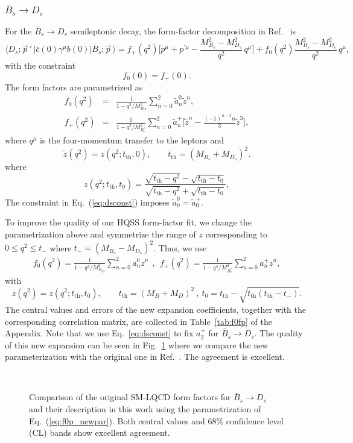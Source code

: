 \documentclass[aps,superscriptaddress,showpacs,nofootinbib,11pt]{revtex4-1}
\newcommand{\be}{\begin{equation}} \newcommand{\ee}{\end{equation}}
\newcommand{\bea}{\begin{eqnarray}} \newcommand{\eea}{\end{eqnarray}}
\newcommand{\mbs}{M_{B_s}}
\newcommand{\mds}{M_{D_s}}
\newcommand\tth{t_\text{th}}
\newcommand\zhpqcd{\tilde z}
\begin{document}
\subsubsection{$\bar B_s\to
D_s$}
For the $\bar B_s\to D_s$ semileptonic decay, the form-factor
decomposition in Ref.~\cite{McLean:2019qcx} is
\be
\langle D_s;\vec p\,'\,|\bar c(0)\gamma^\mu b(0)|\bar B_s;\vec p\,\rangle=
f_+(q^2)\Big[p^\mu+p^{\prime\mu}-\frac{\mbs^2-\mds^2}{q^2}\,q^\mu\Big]
+f_0(q^2)\frac{\mbs^2-\mds^2}{q^2}\,q^\mu,
\ee
with the constraint
\be
f_0(0)=f_+(0).
\label{eq:dsconst}
\ee
The form factors are parametrized  as~\cite{McLean:2019qcx}
\bea
f_0(q^2)&=&\frac1{1-q^2/M^2_{B_{c0}}}\sum_{n=0}^2
 \tilde a^0_n \zhpqcd^n,\nonumber\\
f_+(q^2)&=&\frac1{1-q^2/M^2_{B^*_{c}}}\sum_{n=0}^2
 \tilde a^+_n \Big[\zhpqcd^n
-\frac{(-1)^{n-3}n}{3}\zhpqcd^3\Big],
\eea
where $q^\mu$ is the four-momentum transfer to the leptons and 
\be
\zhpqcd(q^2)= z(q^2;\tth,0), \qquad \tth=(\mbs+\mds)^2.
\ee
where
\be
z(q^2;\tth,t_0)=\frac{\sqrt{\tth-q^2}-\sqrt{\tth-t_0}}{\sqrt{\tth-q^2}+\sqrt{\tth-t_0}}, \label{eq:defz}
\ee
%
The constraint in Eq.~(\ref{eq:dsconst}) imposes $\tilde a_0^0=\tilde
a_0^+$.




To improve the quality of our  HQSS  form-factor fit,  we change the parametrization
above and  symmetrize the range of $z$ corresponding to $0 \leq q^2 \leq
t_-$ where $t_-=(\mbs-\mds)^2$. Thus, we use
%
\bea
f_0(q^2)=\frac1{1-q^2/M^2_{B_{c0}}}\sum_{n=0}^2 a^0_n z^n\ \ ,\ \
f_+(q^2)=\frac1{1-q^2/M^2_{B^*_{c}}}\sum_{n=0}^2 a^+_n z^n,
\label{eq:f0p_newpar}
\eea
%
with
\be
z(q^2)= z(q^2;\tth,t_0), \qquad \tth=(M_B+M_D)^2\ ,\
t_0=\tth-\sqrt{\tth(\tth-t_-)}.\label{eq:def2z}
\ee
The central values and errors of the new expansion coefficients,
together with the corresponding correlation matrix, are collected in 
Table~\ref{tab:f0fp} of the Appendix. Note that we use  Eq.~\eqref{eq:dsconst} to fix $a^+_2$ for $\bar
B_s\to D_s$. The quality of this
new expansion can be seen in Fig.~\ref{fig:comp} where we compare the new parameterization with the original one in Ref.~\cite{McLean:2019qcx}. The agreement is
excellent.
%
%
\begin{figure}
\begin{center}
\\
\caption{ Comparison of the original SM-LQCD form factors for  $\bar B_s\to D_s$~\cite{McLean:2019qcx} and their description in this work using the parametrization of Eq.~(\ref{eq:f0p_newpar}). 
Both central values and 68\% confidence level (CL) bands show excellent agreement.}\label{fig:comp}
\end{center}
\end{figure}
%
%
\end{document}
